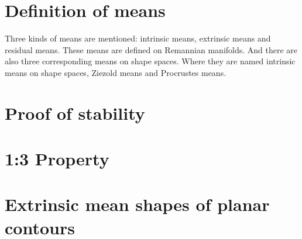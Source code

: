 \documentclass[12pt]{article}
\theoremstyle{definition}
\theoremstyle{remark}
\numberwithin{equation}{section}
\begin{document}
\section{Definition of means}
Three kinds of means are mentioned: intrinsic means, extrinsic means and residual means. These means are defined on Remannian manifolds. And there are also three corresponding means on shape spaces. Where they are named intrinsic means on shape spaces, Ziezold means and Procrustes means.
\section{Proof of stability}
\section{1:3 Property}
\section{Extrinsic mean shapes of planar contours}
\end{document}
